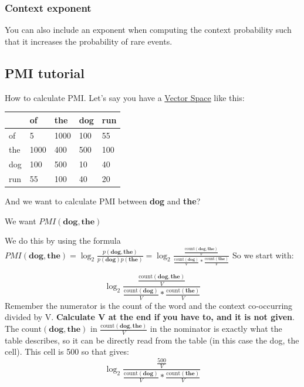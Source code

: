 \documentclass[
  11pt,
  british,
]{article}
\begin{document}
\hypertarget{context-exponent}{%
\subsubsection{Context exponent}\label{context-exponent}}

You can also include an exponent when computing the context probability
such that it increases the probability of rare events.

\hypertarget{pmi-tutorial}{%
\subsection{PMI tutorial}\label{pmi-tutorial}}

How to calculate PMI. Let's say you have a
\href{Vector\%20Space.md}{Vector Space} like this:

\begin{longtable}[]{@{}lllll@{}}
\toprule
& of & the & dog & run \\
\midrule
\endhead
of & 5 & 1000 & 100 & 55 \\
the & 1000 & 400 & 500 & 100 \\
dog & 100 & 500 & 10 & 40 \\
run & 55 & 100 & 40 & 20 \\
\bottomrule
\end{longtable}

And we want to calculate PMI between \textbf{dog} and \textbf{the}?

We want \(PMI(\textbf{dog},\textbf{the})\)

We do this by using the formula
\(PMI(\textbf{dog},\textbf{the}) = \log_2\frac{p(\textbf{dog},\textbf{the})}{p(\textbf{dog})p(\textbf{the})} = \log_2\frac{\frac{\text{count}(\textbf{dog},\textbf{the})}{V}}{\frac{\text{count}(\textbf{dog})}{V}*\frac{\text{count}(\textbf{the})}{V}}\)
So we start with:

\[\log_2\frac{\frac{\text{count}(\textbf{dog},\textbf{the})}{V}}{\frac{\text{count}(\textbf{dog})}{V}*\frac{\text{count}(\textbf{the})}{V}}\]
Remember the numerator is the count of the word and the context
co-occurring divided by V. \textbf{Calculate V at the end if you have
to, and it is not given}. The
\(\text{count} ( \textbf{dog}, \textbf{the} )\) in
\(\frac{ \text{count} ( \textbf{dog}, \textbf{the} )}{V}\) in the
nominator is exactly what the table describes, so it can be directly
read from the table (in this case the dog, the cell). This cell is 500
so that gives:
\[\log_2\frac{\frac{500}{V}}{\frac{\text{count}(\textbf{dog})}{V}*\frac{\text{count}(\textbf{the})}{V}}\]
\end{document}
